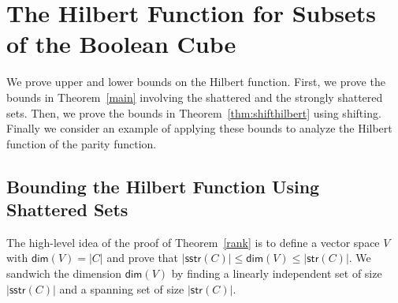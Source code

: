 \documentclass[11pt]{article}
\theoremstyle{definition}
\newcommand{\1}{\mathbf{1}}
\renewcommand{\dim}{\mathsf{dim}}
\renewcommand{\leq}{\leqslant}
\newcommand{\sstr}{\mathsf{sstr}}
\newcommand{\str}{\mathsf{str}}
\begin{document}
\section{The Hilbert Function for Subsets of the Boolean Cube} \label{section:hilbert}
We prove upper and lower bounds on the Hilbert function.  First, we prove the bounds in Theorem~\ref{main} involving the shattered and the strongly shattered sets. Then, we prove the bounds in Theorem~\ref{thm:shifthilbert} using shifting. Finally we consider an example of  applying these bounds to analyze the Hilbert function of the parity function.  
\subsection{Bounding the Hilbert Function Using Shattered Sets}\label{sec:proofmain}

The high-level idea of the proof of Theorem~\ref{rank} is to define a vector space $V$ with $\dim(V)=|C|$ and prove that $|\sstr(C)|\leq \dim(V) \leq |\str(C)|$.  We sandwich the dimension $\dim(V)$ by finding a linearly independent set of size $|\sstr(C)|$ and a spanning set of size $|\str(C)|$. 
\end{document}
